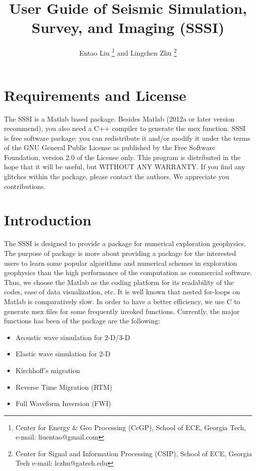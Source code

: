 \documentclass[11pt]{article}
\theoremstyle{plain}
\theoremstyle{definition}
\theoremstyle{remark}
\numberwithin{equation}{section}
\begin{document}
\title{User Guide of Seismic Simulation, Survey, and Imaging (SSSI)}
\author{Entao Liu \thanks{Center for Energy \& Geo Processing (CeGP), School of ECE, Georgia Tech, e-mail: liuentao@gmail.com}
and Lingchen Zhu \thanks{Center for Signal and Information Processing (CSIP), School of ECE, Georgia Tech 
e-mail: lczhu@gatech.edu}} \maketitle
\tableofcontents
\newpage
\section{Requirements and License}

The SSSI is a Matlab based package. Besides Matlab (2012a or later version recommend), you also need a C++ compiler to generate the mex function. 
SSSI is free software package: you can redistribute it and/or modify it under the terms of the GNU General Public License as
published by the Free Software Foundation, version 2.0 of the License only. This program is distributed in the hope that 
it will be useful, but WITHOUT ANY WARRANTY. If you find any glitches within the package, please contact the authors. 
We appreciate you contributions. 


\section{Introduction}
The SSSI is designed to provide a package for numerical exploration geophysics. The purpose of package is more about providing a package for the interested 
users to learn some popular algorithms and numerical schemes in exploration geophysics than the high performance of the computation as commercial software. 
Thus, we choose the Matlab as the coding platform for its readability of the codes, ease of data visualization, etc. It is well known that nested for-loops on Matlab 
is comparatively slow. In order to have a better efficiency, we use C to generate mex files for some frequently invoked functions.
Currently, the major functions has been of the package are the following:
\begin{itemize}
\item Acoustic wave simulation for 2-D/3-D
\item Elastic wave simulation for 2-D
\item Kirchhoff's migration
\item Reverse Time Migration (RTM)
\item Full Waveform Inversion (FWI)
\end{itemize}
\end{document}
